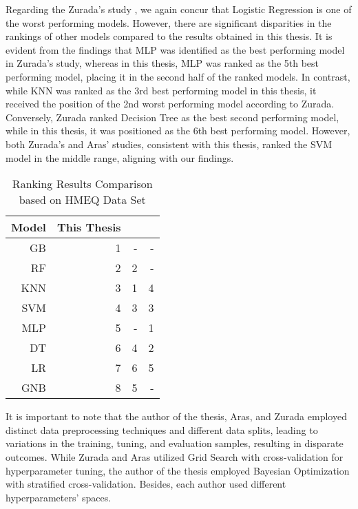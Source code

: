 Regarding the Zurada's study \citep{zurada2014classification}, we again concur that Logistic Regression is one of the worst performing models.
However, there are significant disparities in the rankings of other models compared to the results obtained in this thesis.
It is evident from the findings that MLP was identified as the best performing model in Zurada's study, whereas in this thesis, MLP was ranked as the 5th best performing model, placing it in the second half of the ranked models.
In contrast, while KNN was ranked as the 3rd best performing model in this thesis, it received the position of the 2nd worst performing model according to Zurada.
Conversely, Zurada ranked Decision Tree as the best second performing model, while in this thesis, it was positioned as the 6th best performing model.
However, both Zurada's and Aras' studies, consistent with this thesis, ranked the SVM model in the middle range, aligning with our findings.
\begin{table}[H]
    \small
    \setlength{\tabcolsep}{8pt}
    \renewcommand{\arraystretch}{1.3}
    \centering
        \caption[Ranking Results Comparison based on HMEQ Data Set]{Ranking Results Comparison based on HMEQ Data Set}\label{tab:comparisonfinal}
        \begin{tabular}{r r r r}
    \toprule
    \textbf{Model} & \textbf{This Thesis} & \textbf{\citep{serkan2021bagging}} & \textbf{\citep{zurada2014classification}}\\
    \midrule
    \hline
    GB & 1 & - & - \\ 
    RF & 2 & 2 & - \\ 
    KNN & 3 & 1 & 4 \\ 
    SVM & 4 & 3 & 3 \\ 
    MLP & 5 & - & 1 \\ 
    DT & 6 & 4 & 2 \\ 
    LR & 7 & 6 & 5 \\
    GNB & 8 & 5 & - \\
    \hline
    \bottomrule
    \end{tabular}
    \vspace{0.35em}

        \vspace{-1em}
\end{table}

It is important to note that the author of the thesis, Aras, and Zurada employed distinct data preprocessing techniques and different data splits, leading to variations in the training, tuning, and evaluation samples, resulting in disparate outcomes.
While Zurada and Aras utilized Grid Search with cross-validation for hyperparameter tuning, the author of the thesis employed Bayesian Optimization with stratified cross-validation. Besides, each author used different hyperparameters' spaces.

